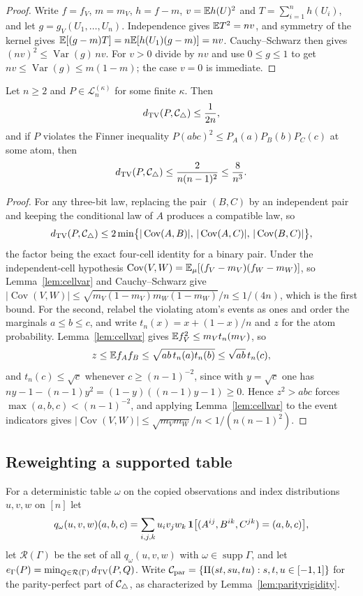 \begin{proof}
Write $f=f_V$, $m=m_V$, $h=f-m$, $v=\mathbb E h(U)^2$ and $T=\sum_{i=1}^nh(U_i)$, and let $g=g_V(U_1,\dots,U_n)$. Independence gives $\mathbb E T^2=nv$, and symmetry of the kernel gives $\mathbb E[(g-m)T]=n\mathbb E[h(U_1)(g-m)]=nv$. Cauchy--Schwarz then gives $(nv)^2\le\operatorname{Var}(g)\,nv$. For $v>0$ divide by $nv$ and use $0\le g\le1$ to get $nv\le\operatorname{Var}(g)\le m(1-m)$; the case $v=0$ is immediate.
\end{proof}

\begin{proposition}\label{prop:cellceiling}
Let $n\ge2$ and $P\in\mathcal L_n^{(\kappa)}$ for some finite $\kappa$. Then
\[
d_{\operatorname{TV}}(P,\mathcal C_{\triangle})\le\frac1{2n},
\]
and if $P$ violates the Finner inequality $P(abc)^2\le P_A(a)P_B(b)P_C(c)$ at some atom, then
\[
d_{\operatorname{TV}}(P,\mathcal C_{\triangle})\le\frac2{n(n-1)^2}\le\frac8{n^3}.
\]
\end{proposition}

\begin{proof}
For any three-bit law, replacing the pair $(B,C)$ by an independent pair and keeping the conditional law of $A$ produces a compatible law, so
\[
d_{\operatorname{TV}}(P,\mathcal C_{\triangle})\le2\min\bigl\{|\operatorname{Cov}(A,B)|,\,|\operatorname{Cov}(A,C)|,\,|\operatorname{Cov}(B,C)|\bigr\},
\]
the factor being the exact four-cell identity for a binary pair. Under the independent-cell hypothesis $\operatorname{Cov}(V,W)=\mathbb E_\mu[(f_V-m_V)(f_W-m_W)]$, so Lemma~\ref{lem:cellvar} and Cauchy--Schwarz give $|\operatorname{Cov}(V,W)|\le\sqrt{m_V(1-m_V)m_W(1-m_W)}/n\le1/(4n)$, which is the first bound. For the second, relabel the violating atom's events as ones and order the marginals $a\le b\le c$, and write $t_n(x)=x+(1-x)/n$ and $z$ for the atom probability. Lemma~\ref{lem:cellvar} gives $\mathbb E f_V^2\le m_Vt_n(m_V)$, so
\[
z\le\mathbb E f_Af_B\le\sqrt{ab\,t_n(a)t_n(b)}\le\sqrt{ab}\,t_n(c),
\]
and $t_n(c)\le\sqrt c$ whenever $c\ge(n-1)^{-2}$, since with $y=\sqrt c$ one has $ny-1-(n-1)y^2=(1-y)((n-1)y-1)\ge0$. Hence $z^2>abc$ forces $\max(a,b,c)<(n-1)^{-2}$, and applying Lemma~\ref{lem:cellvar} to the event indicators gives $|\operatorname{Cov}(V,W)|\le\sqrt{m_Vm_W}/n<1/(n(n-1)^2)$.
\end{proof}


\subsection{Reweighting a supported table}

For a deterministic table $\omega$ on the copied observations and index distributions $u,v,w$ on $[n]$ let
\[
q_\omega(u,v,w)(a,b,c)=\sum_{i,j,k}u_iv_jw_k\,\mathbf 1\bigl[(A^{ij},B^{ik},C^{jk})=(a,b,c)\bigr],
\]
let $\mathcal R(\Gamma)$ be the set of all $q_\omega(u,v,w)$ with $\omega\in\operatorname{supp}\Gamma$, and let $e_\Gamma(P)=\min_{Q\in\mathcal R(\Gamma)}d_{\operatorname{TV}}(P,Q)$. Write $\mathcal C_{\mathrm{par}}=\{\Pi(st,su,tu):s,t,u\in[-1,1]\}$ for the parity-perfect part of $\mathcal C_{\triangle}$, as characterized by Lemma~\ref{lem:parityrigidity}.

